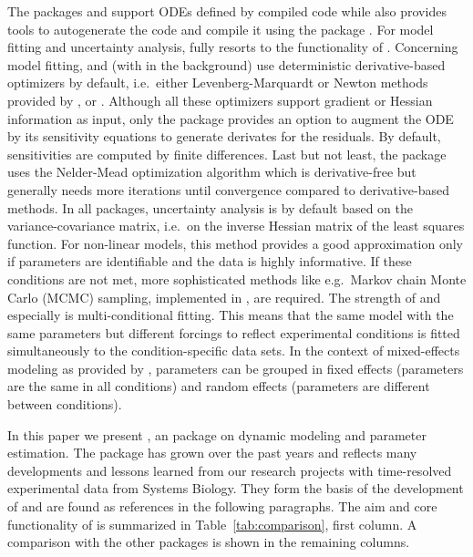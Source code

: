 \documentclass[article]{jss}
\begin{document}
The packages  and  support ODEs defined by compiled code while  also provides tools to autogenerate the  code and compile it using the  package \citep{inline}. For model fitting and uncertainty analysis,  fully resorts to the functionality of .
Concerning model fitting,  and  (with  in the background) use deterministic derivative-based optimizers by default, i.e.~either Levenberg-Marquardt or Newton methods provided by ,  or . Although all these optimizers support gradient or Hessian information as input, only the  package provides an option to augment the ODE by its sensitivity equations to generate derivates for the residuals. By default, sensitivities are computed by finite differences. Last but not least, the  package uses the Nelder-Mead optimization algorithm which is derivative-free but generally needs more iterations until convergence compared to derivative-based methods.
In all packages, uncertainty analysis is by default based on the variance-covariance matrix, i.e.~on the inverse Hessian matrix of the least squares function. For non-linear models, this method provides a good approximation only if parameters are identifiable and the data is highly informative. If these conditions are not met, more sophisticated methods like e.g.~Markov chain Monte Carlo (MCMC) sampling, implemented in , are required.
The strength of  and especially  is multi-conditional fitting. This means that the same model with the same parameters but different forcings to reflect experimental conditions is fitted simultaneously to the condition-specific data sets. In the context of mixed-effects modeling as provided by , parameters can be grouped in fixed effects (parameters are the same in all conditions) and random effects (parameters are different between conditions).

In this paper we present , an  package on dynamic modeling and parameter estimation. 
The package has grown over the past years and reflects many developments and lessons learned from our research projects with time-resolved experimental data from Systems Biology. They form the basis of the development of  and are found as references in the following paragraphs. The aim and core functionality of  is summarized in Table~\ref{tab:comparison}, first column. A comparison with the other packages is shown in the remaining columns. 
\end{document}
